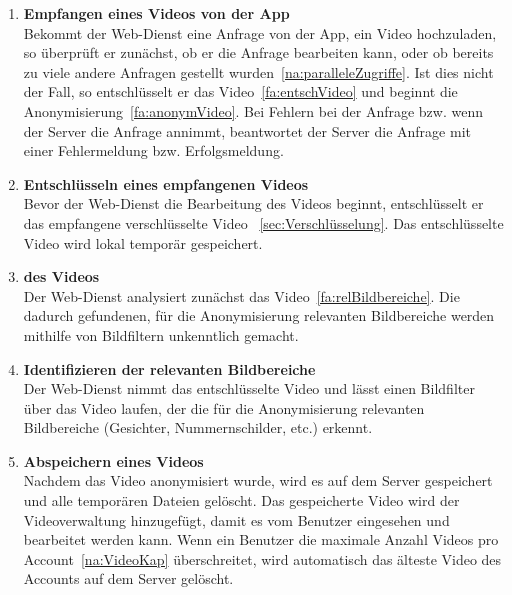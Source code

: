 \begin{enumerate}
\renewcommand{\labelenumi}{\textbf{\theenumi}}
\renewcommand{\theenumi}{FA\arabic{enumi}0}
\setcounter{enumi}{199}

\item \label{fa:empfangVid} \textbf{Empfangen eines Videos von der \gls{App}} \hfill \\
Bekommt der \gls{Web-Dienst} eine Anfrage von der App, ein Video hochzuladen, so überprüft er zunächst, ob er die Anfrage bearbeiten kann, oder ob bereits zu viele andere Anfragen gestellt wurden~\eqref{na:paralleleZugriffe}. Ist dies nicht der Fall, so entschlüsselt er das Video~\eqref{fa:entschVideo} und beginnt die Anonymisierung~\eqref{fa:anonymVideo}. Bei Fehlern bei der Anfrage bzw. wenn der Server die Anfrage annimmt, beantwortet der Server die Anfrage mit einer Fehlermeldung bzw. Erfolgsmeldung.

\item  \label{fa:entschVideo}\textbf{Entschlüsseln eines empfangenen Videos} \hfill \\
Bevor der \gls{Web-Dienst} die Bearbeitung des Videos beginnt, entschlüsselt er das empfangene verschlüsselte Video ~\ref{sec:Verschlüsselung}. Das entschlüsselte Video wird lokal temporär gespeichert.

\item  \label{fa:anonymVideo}\textbf{ des Videos} \hfill \\
Der \gls{Web-Dienst} analysiert zunächst das Video~\eqref{fa:relBildbereiche}. Die dadurch gefundenen, für die Anonymisierung relevanten Bildbereiche werden mithilfe von Bildfiltern unkenntlich gemacht.

\item  \label{fa:relBildbereiche}\textbf{Identifizieren der relevanten Bildbereiche} \hfill \\
Der \gls{Web-Dienst} nimmt das entschlüsselte Video und lässt einen Bildfilter über das Video laufen, der die für die Anonymisierung relevanten Bildbereiche (Gesichter, Nummernschilder, etc.) erkennt.

\item \label{fa:speichVideo}\textbf{Abspeichern eines  Videos} \hfill \\
Nachdem das Video anonymisiert wurde, wird es auf dem Server gespeichert und alle temporären Dateien gelöscht. Das gespeicherte Video wird der Videoverwaltung hinzugefügt, damit es vom Benutzer eingesehen und bearbeitet werden kann. Wenn ein Benutzer die maximale Anzahl Videos pro Account~\eqref{na:VideoKap} überschreitet, wird automatisch das älteste Video des Accounts auf dem Server gelöscht.


\end{enumerate}
